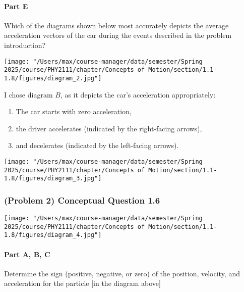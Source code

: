 \paragraph{Part E}
Which of the diagrams shown below most accurately depicts the average acceleration vectors of the car during the events described in the problem introduction?

\begin{center}
	\texttt{[image: "/Users/max/course-manager/data/semester/Spring 2025/course/PHY2111/chapter/Concepts of Motion/section/1.1-1.8/figures/diagram\_2.jpg"]}
\end{center}

\vspace{1em}

\begin{solution}
	I chose diagram $B$, as it depicts the car's acceleration appropriately:
	\begin{enumerate}
		\item The car starts with zero acceleration,
		\item the driver accelerates (indicated by the right-facing arrows),
		\item and decelerates (indicated by the left-facing arrows).
	\end{enumerate}
\end{solution}

\begin{center}
	\texttt{[image: "/Users/max/course-manager/data/semester/Spring 2025/course/PHY2111/chapter/Concepts of Motion/section/1.1-1.8/figures/diagram\_3.jpg"]}
\end{center}

\newpage

\subsubsection{(Problem 2) Conceptual Question 1.6}

\begin{center}
	\texttt{[image: "/Users/max/course-manager/data/semester/Spring 2025/course/PHY2111/chapter/Concepts of Motion/section/1.1-1.8/figures/diagram\_4.jpg"]}
\end{center}

\paragraph{Part A, B, C}
Determine the sign (positive, negative, or zero) of the position, velocity, and acceleration for the particle [in the diagram above]

